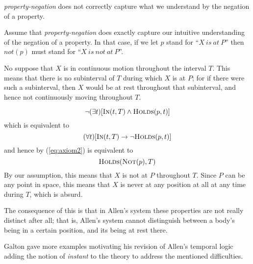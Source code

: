 \begin{exmp} \textit{property-negation} does not correctly capture what we understand by the negation of a property.

	Assume that \textit{property-negation} does exactly capture our intuitive understanding of the negation of a property. In that case, if we let $p$ stand for ``$X \  is \  at \ P$''
	then $not(p)$ must stand for ``$X \  is \  not \  at \ P$''.

	No suppose that $X$ is in continuous motion throughout the interval $T$. This means that there is no subinterval of $T$ during which $X$ is at $P$;
	for if there were such a subinterval, then $X$ would be at rest throughout that subinterval, and hence not continuously moving throughout $T$.

	\begin{equation}
		\neg (\exists t)[\textsc{In}(t, T) \land \textsc{Holds}(p, t)]
	\end{equation}
	which is equivalent to
	\begin{equation}
		(\forall t)[\textsc{In}(t, T) \to \neg \textsc{Holds}(p, t)]
	\end{equation}
	and hence by (\ref{eq:axiom2}) is equivalent to
	\begin{equation}
		\textsc{Holds}(\textsc{Not}(p), T)
	\end{equation}
	By our assumption, this means that $X$ is not at $P$ throughout $T$. Since $P$ can be any point in space, this means that $X$ is never at any position at all at any time during $T$, which is absurd.

	The consequence of this is that in Allen's system these properties are not really distinct after all; that is, Allen's system cannot distinguish between a body's being in a certain position, and its being at rest there.
\end{exmp}

Galton gave more examples motivating his revision of Allen's temporal logic adding the notion of \textit{instant} to the theory to address the mentioned difficulties.

